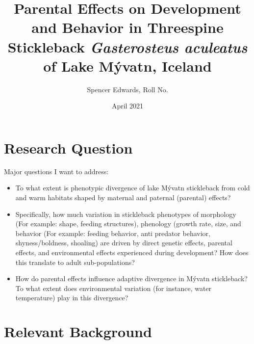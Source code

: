 \documentclass[12pt]{extarticle}
\title{Parental Effects on Development and Behavior in Threespine Stickleback \textit{Gasterosteus aculeatus} of Lake M\'yvatn, Iceland}
\author{Spencer Edwards, Roll No.}
\date{April 2021}
\begin{document}
\maketitle

\section*{Research Question}
Major questions I want to address:
\begin{itemize}
 \item To what extent is phenotypic divergence of lake M\'yvatn stickleback from cold and warm habitats
shaped by maternal and paternal (parental) effects?
 \item Specifically, how much variation in stickleback phenotypes  of morphology (For example:  shape, feeding structures), phenology (growth rate, size,  and behavior (For example: feeding behavior, anti predator behavior, shyness/boldness, shoaling) are driven by direct genetic effects, parental effects, and environmental effects experienced during development? How does this translate to adult sub-populations?
 \item How do parental effects influence adaptive divergence in M\'yvatn stickleback? To what extent does environmental variation (for instance, water temperature) play in this divergence?
\end{itemize}

\section*{Relevant Background}
\end{document}
